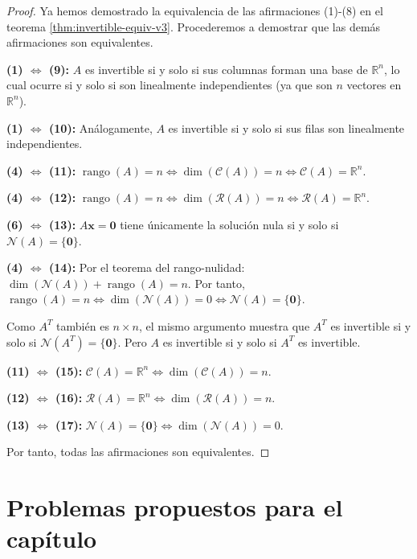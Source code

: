 \begin{proof}
Ya hemos demostrado la equivalencia de las afirmaciones (1)-(8) en el teorema \ref{thm:invertible-equiv-v3}. Procederemos a demostrar que las demás afirmaciones son equivalentes.

\textbf{(1) $\Leftrightarrow$ (9):} $A$ es invertible si y solo si sus columnas forman una base de $\mathbb{R}^n$, lo cual ocurre si y solo si son linealmente independientes (ya que son $n$ vectores en $\mathbb{R}^n$).

\textbf{(1) $\Leftrightarrow$ (10):} Análogamente, $A$ es invertible si y solo si sus filas son linealmente independientes.

\textbf{(4) $\Leftrightarrow$ (11):} $\operatorname{rango}(A) = n \Leftrightarrow \dim(\mathcal{C}(A)) = n \Leftrightarrow \mathcal{C}(A) = \mathbb{R}^n$.

\textbf{(4) $\Leftrightarrow$ (12):} $\operatorname{rango}(A) = n \Leftrightarrow \dim(\mathcal{R}(A)) = n \Leftrightarrow \mathcal{R}(A) = \mathbb{R}^n$.

\textbf{(6) $\Leftrightarrow$ (13):} $A\mathbf{x} = \mathbf{0}$ tiene únicamente la solución nula si y solo si $\mathcal{N}(A) = \{\mathbf{0}\}$.

\textbf{(4) $\Leftrightarrow$ (14):} Por el teorema del rango-nulidad: $\dim(\mathcal{N}(A)) + \operatorname{rango}(A) = n$. Por tanto, $\operatorname{rango}(A) = n \Leftrightarrow \dim(\mathcal{N}(A)) = 0 \Leftrightarrow \mathcal{N}(A) = \{\mathbf{0}\}$. 

Como $A^T$ también es $n \times n$, el mismo argumento muestra que $A^T$ es invertible si y solo si $\mathcal{N}(A^T) = \{\mathbf{0}\}$. Pero $A$ es invertible si y solo si $A^T$ es invertible.

\textbf{(11) $\Leftrightarrow$ (15):} $\mathcal{C}(A) = \mathbb{R}^n \Leftrightarrow \dim(\mathcal{C}(A)) = n$.

\textbf{(12) $\Leftrightarrow$ (16):} $\mathcal{R}(A) = \mathbb{R}^n \Leftrightarrow \dim(\mathcal{R}(A)) = n$.

\textbf{(13) $\Leftrightarrow$ (17):} $\mathcal{N}(A) = \{\mathbf{0}\} \Leftrightarrow \dim(\mathcal{N}(A)) = 0$.

Por tanto, todas las afirmaciones son equivalentes.
\end{proof}


\section{Problemas propuestos para el capítulo}

